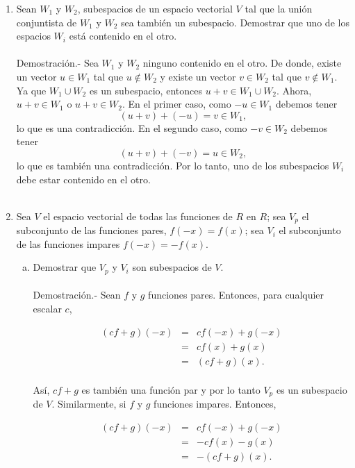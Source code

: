 \begin{enumerate}[\bfseries 1.]
    \item Sean $W_1$ y $W_2$, subespacios de un espacio vectorial $V$ tal que la unión conjuntista de $W_1$ y $W_2$ sea también un subespacio. Demostrar que uno de los espacios $W_i$ está contenido en el otro.\\\\
	Demostración.-\; Sea $W_1$ y $W_2$ ninguno contenido en el otro. De donde, existe un vector $u\in W_1$ tal que $u\notin W_2$ y existe un vector $v\in W_2$ tal que $v\notin W_1$. Ya que $W_1\cup W_2$ es un subespacio, entonces $u+v\in W_1\cup W_2$. Ahora, $u+v\in W_1$ o $u+v\in W_2$. En el primer caso, como $-u\in W_1$ debemos tener
	$$(u+v)+(-u)=v\in W_1,$$
	lo que es una contradicción. En el segundo caso, como $-v\in W_2$ debemos tener
	$$(u+v)+(-v)=u\in W_2,$$
	lo que es también una contradicción. Por lo tanto, uno de los subespacios $W_i$ debe estar contenido en el otro.\\\\

    \item Sea $V$ el espacio vectorial de todas las funciones de $R$ en $R$; sea $V_p$ el subconjunto de las funciones pares, $f(-x)=f(x)$; sea $V_i$ el subconjunto de las funciones impares $f(-x)=-f(x)$.\\
	\begin{enumerate}[(a)]

	    \item Demostrar que $V_p$ y $V_i$ son subespacios de $V$.\\\\
		Demostración.-\; Sean $f$ y $g$ funciones pares. Entonces, para cualquier escalar $c$,

		$$
		\begin{array}{rcl}
		    (cf+g)(-x)&=&cf(-x)+g(-x)\\
			      &=&cf(x)+g(x)\\
			      &=&(cf+g)(x).\\
		\end{array}
		$$

		Así, $cf+g$ es también una función par y por lo tanto $V_p$ es un subespacio de $V$. Similarmente, si $f$ y $g$ funciones impares. Entonces,

		$$
		\begin{array}{rcl}
		    (cf+g)(-x)&=&cf(-x)+g(-x)\\
			      &=&-cf(x)-g(x)\\
			      &=&-(cf+g)(x).\\
		\end{array}
		$$


\end{enumerate}
\end{enumerate}

